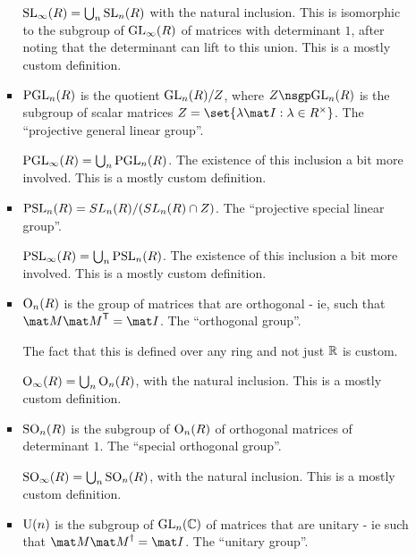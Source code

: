 \documentclass[a4paper,12pt]{article}
\begin{document}
\begin{enumerate}
\begin{itemize}
\begin{itemize}
      \(\mathrm{SL}_\infty(R) = \bigcup_n \mathrm{SL}_n(R)\) with the natural
      inclusion. This is isomorphic to the subgroup of
      \(\mathrm{GL}_\infty(R)\) of matrices with determinant \(1\), after
      noting that the determinant can lift to this union.
      This is a mostly custom definition.
     \item
      \(\mathrm{PGL}_n(R)\) is the quotient
      \(\mathrm{GL}_n(R) / Z\), where \(Z \nsgp \GL_n(R)\) is the
      subgroup of scalar matrices
      \(Z = \set{\lambda \mat I: \lambda \in R^\times}\).
      The ``projective general linear group''.

      \(\mathrm{PGL}_\infty(R) = \bigcup_n \mathrm{PGL}_n(R)\). The existence of this inclusion
      a bit more involved. This is a mostly custom definition.
     \item
      \(\mathrm{PSL}_n(R) = SL_n(R) / (SL_n(R) \cap Z)\).
      The ``projective special linear group''.

      \(\mathrm{PSL}_\infty(R) = \bigcup_n \mathrm{PSL}_n(R)\). The existence of this inclusion
      a bit more involved. This is a mostly custom definition.
     \item
      \(\mathrm{O}_n(R)\) is the group of matrices that are orthogonal -
      ie, such that \(\mat M \tran{\mat M} = \mat I\).
      The ``orthogonal group''.

      The fact that this is defined over any ring and not just \(\mathbb R\) is custom.

      \(\mathrm{O}_\infty(R) = \bigcup_n \mathrm{O}_n(R)\), with the natural inclusion. This is
      a mostly custom definition.
     \item
      \(\mathrm{SO}_n(R)\) is the subgroup of \(\mathrm{O}_n(R)\) of orthogonal matrices of
      determinant \(1\). The ``special orthogonal group''.

      \(\mathrm{SO}_\infty(R) = \bigcup_n \mathrm{SO}_n(R)\), with the natural inclusion. This
      is a mostly custom definition.
     \item
      \(\mathrm{U}(n)\) is the subgroup of \(\mathrm{GL}_n(\mathbb C)\) of matrices that are unitary -
      ie such that \(\mat M \herm{\mat M} = \mat I\).
      The ``unitary group''.


\end{itemize}
\end{itemize}
\end{enumerate}
\end{document}

